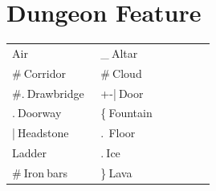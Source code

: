 \part{Dungeon Feature}
\begin{longtable}{|>{\RaggedRight}p{0.41235\linewidth}|>{\RaggedRight}p{0.53050\linewidth}|} \hline 
\multicolumn{2}{|>{\RaggedRight}p{0.97143\linewidth}|}{{\bfseries \hspace*{0pt}\ignorespaces{}\hspace*{0pt}Dungeon features\footnotemark[2]}}\\ \hline \hspace*{0pt}\ignorespaces{}\hspace*{0pt}{\mbox{$~$}}{\mbox{$~$}}Air\footnotemark[3]&\hspace*{0pt}\ignorespaces{}\hspace*{0pt}\_{\mbox{$~$}}Altar\footnotemark[4]\\ \hline \hspace*{0pt}\ignorespaces{}\hspace*{0pt}\#{\mbox{$~$}}Corridor\footnotemark[5]&\hspace*{0pt}\ignorespaces{}\hspace*{0pt}\#{\mbox{$~$}}Cloud\footnotemark[6]\\ \hline \hspace*{0pt}\ignorespaces{}\hspace*{0pt}\#.{\mbox{$~$}}Drawbridge\footnotemark[7]&\hspace*{0pt}\ignorespaces{}\hspace*{0pt}+-{}\allowbreak{}|{\mbox{$~$}}Door\footnotemark[8]\\ \hline \hspace*{0pt}\ignorespaces{}\hspace*{0pt}.{\mbox{$~$}}Doorway\footnotemark[9]&\hspace*{0pt}\ignorespaces{}\hspace*{0pt}\{{\mbox{$~$}}Fountain\footnotemark[10]\\ \hline \hspace*{0pt}\ignorespaces{}\hspace*{0pt}\allowbreak{}|{\mbox{$~$}}Headstone\footnotemark[11]&\hspace*{0pt}\ignorespaces{}\hspace*{0pt}.{\mbox{$~$}}{\mbox{$~$}}Floor\footnotemark[12]\\ \hline \hspace*{0pt}\ignorespaces{}\hspace*{0pt}{\mbox{$>$}}{\mbox{$<$}}{\mbox{$~$}}Ladder\footnotemark[13]&\hspace*{0pt}\ignorespaces{}\hspace*{0pt}.{\mbox{$~$}}Ice\footnotemark[14]\\ \hline \hspace*{0pt}\ignorespaces{}\hspace*{0pt}\#{\mbox{$~$}}Iron{\mbox{$~$}}bars\footnotemark[15]&\hspace*{0pt}\ignorespaces{}\hspace*{0pt}\}{\mbox{$~$}}Lava\footnotemark[16]\\ 
\end{longtable}
